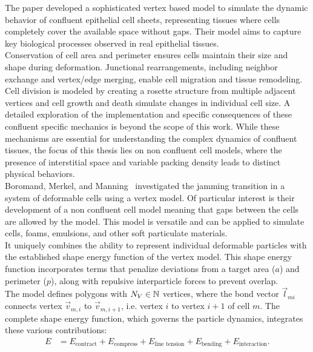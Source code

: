 The paper \cite{Fletcher14} developed a sophisticated vertex based model to simulate the dynamic behavior of confluent epithelial cell sheets, representing tissues where cells completely cover the available space without gaps. 
Their model aims to capture key biological processes observed in real epithelial tissues. \\
Conservation of cell area and perimeter ensures cells maintain their size and shape during deformation.
Junctional rearrangements, including neighbor exchange and vertex/edge merging, enable cell migration and tissue remodeling.
Cell division is modeled by creating a rosette structure from multiple adjacent vertices and cell growth and death simulate changes in individual cell size.
A detailed exploration of the implementation and specific consequences of these confluent specific mechanics is beyond the scope of this work.
While these mechanisms are essential for understanding the complex dynamics of confluent tissues, the focus of this thesis lies on non confluent cell models, where the presence of interstitial space and variable packing density leads to distinct physical behaviors. \\

Boromand, Merkel, and Manning~\cite{Boromand2018} investigated the jamming transition in a system of deformable cells using a vertex model. 
Of particular interest is their development of a non confluent cell model meaning that gaps between the cells are allowed by the model. 
This model is versatile and can be applied to simulate cells, foams, emulsions, and other soft particulate materials. \\
It uniquely combines the ability to represent individual deformable particles with the established shape energy function of the vertex model. 
This shape energy function incorporates terms that penalize deviations from a target area ($a$) and perimeter ($p$), along with repulsive interparticle forces to prevent overlap. \\
The model defines polygons with $N_V \in \mathbb{N}$ vertices, where the bond vector $\vec{l}_{mi}$ connects vertex $\vec{v}_{m,i}$ to $\vec{v}_{m,i+1}$, i.e. vertex $i$ to vertex $i+1$ of cell $m$.
The complete shape energy function, which governs the particle dynamics, integrates these various contributions:
\begin{align*}
	E &= E_{\text{contract}} + E_{\text{compress}} + E_{\text{line tension}} + E_{\text{bending}} + E_{\text{interaction}}.
\end{align*}

